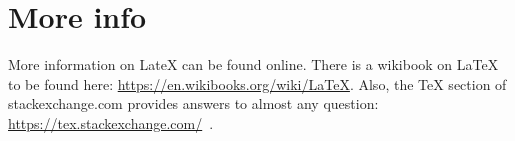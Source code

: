 \chapter{More info}

More information on LateX can be found online. There is a wikibook on LaTeX
to be found here: \url{https://en.wikibooks.org/wiki/LaTeX}. Also, the
TeX section of stackexchange.com provides answers to almost any question:
\url{https://tex.stackexchange.com/}~\cite{stackexchange}.
